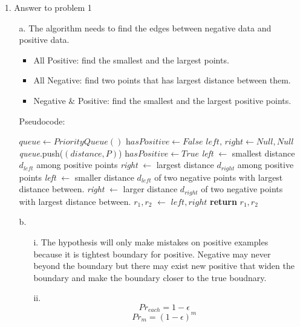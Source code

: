 \begin{enumerate}
\item[1.] Answer to problem 1
	\begin{enumerate}
	\item[a.] The algorithm needs to find the edges between negative data and positive data.
		\begin{itemize}
		\item All Positive: find the smallest and the largest points.
		\item All Negative: find two points that has largest distance between them.
		\item Negative $\&$ Positive: find the smallest and the largest positive points.
		\end{itemize}
		\begin{algorithm}
		\caption{Pseudocode:}\label{euclid}
		\begin{algorithmic}[1]
		\State $\textit{queue} \gets Priority Queue()$
		\State $\textit{hasPositive} \gets False$
		\State $\textit{left, right} \gets Null, Null$
			\State \textit{queue}.push($(distance, P)$)
				\State $\textit{hasPositive} \gets True$
			\EndIf
      	\EndFor
			\State \textit{left} $\gets$ smallest distance $d_{left}$ among positive points
			\State \textit{right} $\gets$ largest distance $d_{right}$ among positive points
		\EndIf
			\State \textit{left} $\gets$ smaller distance $d_{left}$ of two negative points with largest distance between.
			\State \textit{right} $\gets$ larger distance $d_{right}$ of two negative points with largest distance between.
		\EndIf
		\State \textit{$r_1, r_2$} $\gets$ $left, right$
      	\State \textbf{return} \textit{$r_1,r_2$}
		\EndProcedure
		\end{algorithmic}
		\end{algorithm}
	\item[b.]
		\begin{enumerate}
		\item[i.] The hypothesis will only make mistakes on positive examples because it is tightest boundary for positive. Negative may never beyond the boundary but there may exist new positive that widen the boundary and make the boundary closer to the true boudnary.
		\item[ii.] 
		\[ Pr_{each} = 1 - \epsilon \]
		\[ Pr_{m} = (1 - \epsilon)^m \]

\end{enumerate}
\end{enumerate}
\end{enumerate}
